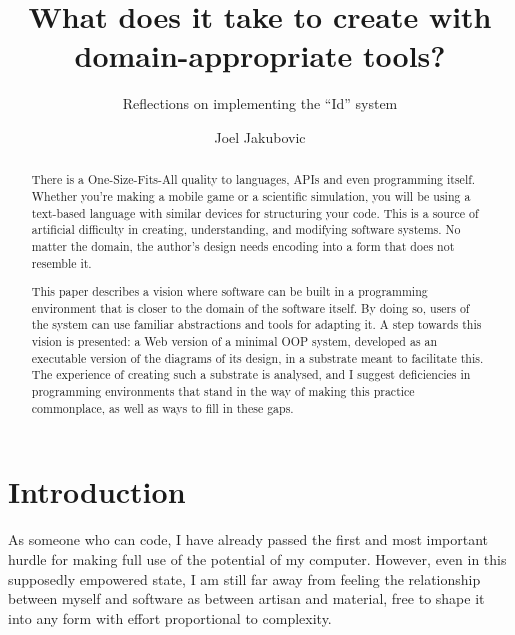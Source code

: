 \newcommand{\OROM}{Id}
\title{What does it take to create with domain-appropriate tools?}
\subtitle{Reflections on implementing the ``Id{}'' system}
\author[ ]{Joel Jakubovic}

\maketitle

\newcommand{\joel}[1]{}
\newcommand{\svgel}[1]{\texttt{\textless{}#1\textgreater{}}}
\newcommand{\OSFA}{One-Size-Fits-All}
\newcommand{\xywh}{\texttt{x},\texttt{y},\texttt{width},\texttt{height}}

\begin{abstract}
There is a One-Size-Fits-All{} quality to languages, APIs and even programming itself. Whether you're making a mobile game or a scientific simulation, you will be using a text-based language with similar devices for structuring your code. This is a source of artificial difficulty in creating, understanding, and modifying software systems. No matter the domain, the author's design needs encoding into a form that does not resemble it.

This paper describes a vision where software can be built in a programming environment that is closer to the domain of the software itself. By doing so, users of the system can use familiar abstractions and tools for adapting it. A step towards this vision is presented: a Web version of a minimal OOP system, developed as an executable version of the diagrams of its design, in a substrate meant to facilitate this. The experience of creating such a substrate is analysed, and I suggest deficiencies in programming environments that stand in the way of making this practice commonplace, as well as ways to fill in these gaps.
\end{abstract}


\hypertarget{introduction}{%
\section{Introduction}\label{introduction}}

As someone who can code, I have already passed the first and most
important hurdle for making full use of the potential of my computer.
However, even in this supposedly empowered state, I am still far away
from feeling the relationship between myself and software as between
artisan and material, free to shape it into any form with effort
proportional to complexity.

